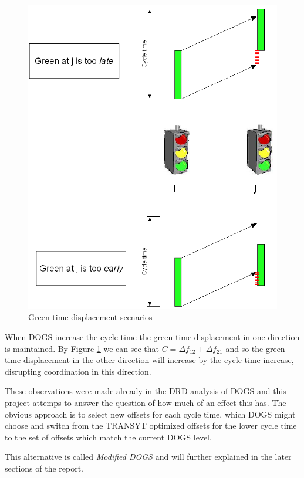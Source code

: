 \begin{figure}[htbp]
\centering
\includegraphics[scale=0.30]{green_time_displacement.png} 
\caption{Green time displacement scenarios}
\label{fig:green_time_displacement}
\end{figure}

When DOGS increase the cycle time the green time displacement in one direction is maintained. By Figure \ref{fig:green_time_displacement} we can see that $C = \Delta f_{12} + \Delta f_{21}$ and so the green time displacement in the other direction will increase by the cycle time increase, disrupting coordination in this direction.

These observations were made already in the DRD analysis of DOGS \cite{dogs} and this project attemps to answer the question of how much of an effect this has. The obvious approach is to select new offsets for each cycle time, which DOGS might choose and switch from the TRANSYT optimized offsets for the lower cycle time to the set of offsets which match the current DOGS level.

This alternative is called \textit{Modified DOGS} and will further explained in the later sections of the report.